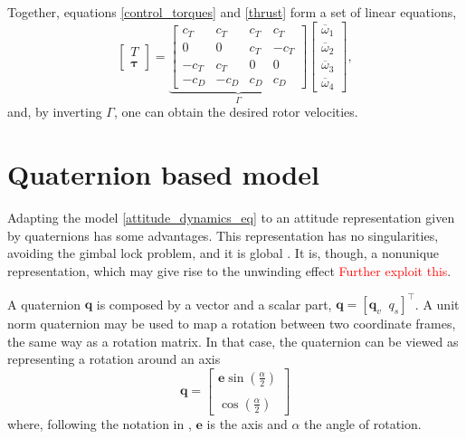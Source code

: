 		Together, equations \eqref{control_torques} and \eqref{thrust} form a set of linear equations,
		\begin{equation}
			\begin{bmatrix}
				T \\
				\boldsymbol \tau
			\end{bmatrix} = \underbrace{\begin{bmatrix}
						c_T & c_T & c_T & c_T\\
						0   &  0  & c_T & -c_T\\
						-c_T& c_T & 0   &  0 \\
						-c_D& -c_D& c_D & c_D
					\end{bmatrix}}_\Gamma
					\begin{bmatrix}
						\overline{\omega}_1\\
						\overline{\omega}_2\\
						\overline{\omega}_3\\
						\overline{\omega}_4
					\end{bmatrix},
			\label{thrust_torques_matrix}
		\end{equation}
		and, by inverting $\Gamma$, one can obtain the desired rotor velocities.
		
\section{Quaternion based model}
	Adapting the model \eqref{attitude_dynamics_eq} to an attitude representation given by quaternions has some advantages. This representation has no singularities, avoiding the gimbal lock problem, and it is global \cite{rigid_attitude_control} \cite{survey_attitude}. It is, though, a nonunique representation, which may give rise to the unwinding effect \cite{rigid_attitude_control} \textcolor{red}{Further exploit this}.
	
	A quaternion $\mathbf{q}$ is composed by a vector and a scalar part, $\mathbf{q} = \left [\mathbf{q}_v\;\;q_s \right]^\top$. A unit norm quaternion may be used to map a rotation between two coordinate frames, the same way as a rotation matrix. In that case, the quaternion can be viewed as representing a rotation around an axis
	\begin{equation}
		\mathbf{q} = \begin{bmatrix}
				\mathbf{e} \sin \left (\displaystyle\frac{\alpha}{2} \right)\\\\
				\cos \left (\displaystyle\frac{\alpha}{2} \right)
			     \end{bmatrix}
	 	\label{quaternion_eq}
	 \end{equation}
	 where, following the notation in \cite{lohmann_attitude}, $\mathbf{e}$ is the axis and $\alpha$ the angle of rotation.
	 
